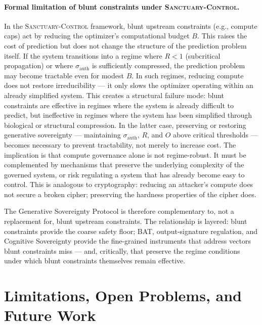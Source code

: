 \documentclass[11pt, a4paper]{article}
\theoremstyle{remark}
\newcommand{\SC}{\textsc{Sanctuary-Control}}
\begin{document}
\paragraph{Formal limitation of blunt constraints under \SC{}.} In the \SC{} framework, blunt upstream constraints (e.g., compute caps) act by reducing the optimizer's computational budget $B$. This raises the cost of prediction but does not change the structure of the prediction problem itself. If the system transitions into a regime where $R < 1$ (subcritical propagation) or where $\sigma_{\text{auth}}$ is sufficiently compressed, the prediction problem may become tractable even for modest $B$. In such regimes, reducing compute does not restore irreducibility --- it only slows the optimizer operating within an already simplified system. This creates a structural failure mode: blunt constraints are effective in regimes where the system is already difficult to predict, but ineffective in regimes where the system has been simplified through biological or structural compression. In the latter case, preserving or restoring generative sovereignty --- maintaining $\sigma_{\text{auth}}$, $R$, and $O$ above critical thresholds --- becomes necessary to prevent tractability, not merely to increase cost. The implication is that compute governance alone is not regime-robust. It must be complemented by mechanisms that preserve the underlying complexity of the governed system, or risk regulating a system that has already become easy to control. This is analogous to cryptography: reducing an attacker's compute does not secure a broken cipher; preserving the hardness properties of the cipher does.

The Generative Sovereignty Protocol is therefore complementary to, not a replacement for, blunt upstream constraints. The relationship is layered: blunt constraints provide the coarse safety floor; BAT, output-signature regulation, and Cognitive Sovereignty provide the fine-grained instruments that address vectors blunt constraints miss --- and, critically, that preserve the regime conditions under which blunt constraints themselves remain effective.

\section{Limitations, Open Problems, and Future Work}\label{sec:limitations}
\end{document}
